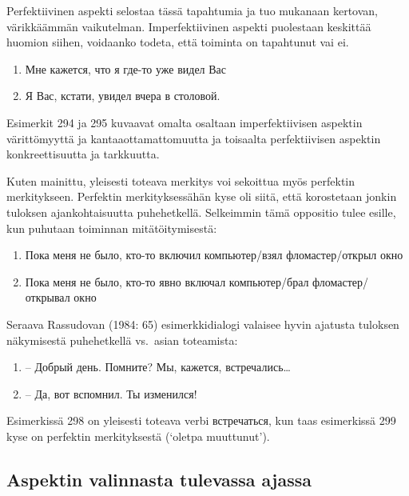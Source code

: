 \documentclass[]{scrartcl}
\providecommand{\tightlist}{%
  \setlength{\itemsep}{0pt}\setlength{\parskip}{0pt}}
\begin{document}
Perfektiivinen aspekti selostaa tässä tapahtumia ja tuo mukanaan
kertovan, värikkäämmän vaikutelman. Imperfektiivinen aspekti puolestaan
keskittää huomion siihen, voidaanko todeta, että toiminta on tapahtunut
vai ei.

\begin{enumerate}
\def\labelenumi{(\arabic{enumi})}
\setcounter{enumi}{293}
\tightlist
\item
  Мне кажется, что я где-то уже видел Вас
\item
  Я Вас, кстати, увидел вчера в столовой.
\end{enumerate}

Esimerkit 294 ja 295 kuvaavat omalta osaltaan imperfektiivisen aspektin
värittömyyttä ja kantaaottamattomuutta ja toisaalta perfektiivisen
aspektin konkreettisuutta ja tarkkuutta.

Kuten mainittu, yleisesti toteava merkitys voi sekoittua myös perfektin
merkitykseen. Perfektin merkityksessähän kyse oli siitä, että
korostetaan jonkin tuloksen ajankohtaisuutta puhehetkellä. Selkeimmin
tämä oppositio tulee esille, kun puhutaan toiminnan mitätöitymisestä:

\begin{enumerate}
\def\labelenumi{(\arabic{enumi})}
\setcounter{enumi}{295}
\tightlist
\item
  Пока меня не было, кто-то включил компьютер/взял фломастер/открыл окно
\item
  Пока меня не было, кто-то явно включал компьютер/брал
  фломастер/открывал окно
\end{enumerate}

Seraava Rassudovan (1984: 65) esimerkkidialogi valaisee hyvin ajatusta
tuloksen näkymisestä puhehetkellä vs.~asian toteamista:

\begin{enumerate}
\def\labelenumi{(\arabic{enumi})}
\setcounter{enumi}{297}
\tightlist
\item
  -- Добрый день. Помните? Мы, кажется, встречались\ldots{}
\item
  -- Да, вот вспомнил. Ты изменился!
\end{enumerate}

Esimerkissä 298 on yleisesti toteava verbi встречаться, kun taas
esimerkissä 299 kyse on perfektin merkityksestä (`oletpa muuttunut').

\subsection{Aspektin valinnasta tulevassa
ajassa}\label{aspektin-valinnasta-tulevassa-ajassa}
\end{document}
